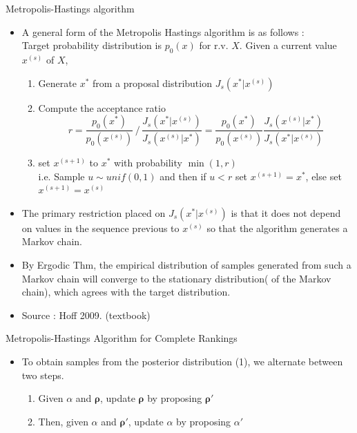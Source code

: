 \documentclass[11pt]{beamer}
\begin{document}
\begin{frame}{Metropolis-Hastings algorithm}
\begin{itemize}
    \item A general form of the Metropolis Hastings algorithm is as follows : \\ Target probability distribution is $p_0(x)$ for r.v. $X$. Given a current value $x^{(s)}$ of $X$, 
        \begin{enumerate}
            \item Generate $x^{*}$ from a proposal distribution $J_s(x^{*}|x^{(s)})$
            \item Compute the acceptance ratio $$ r=\frac{p_0(x^*)}{p_0(x^{(s)})}\, /\, \frac{J_s(x^*|x^{(s)})}{J_s(x^{(s)}|x^*)} = \frac{p_0(x^*)}{p_0(x^{(s)})}\frac{J_s(x^{(s)}|x^*)}{J_s(x^*|x^{(s)})} $$
            \item set $x^{(s+1)}$ to $x^*$ with probability $\min (1, r)$ \\ i.e. Sample $u\sim unif(0,1)$ and then if $u<r$ set $x^{(s+1)}=x^*$, else set $x^{(s+1)}=x^{(s)}$
        \end{enumerate}
    \item The primary restriction placed on $J_s(x^*|x^{(s)})$ is that it does not depend on values in the sequence previous to $x^{(s)}$ so that the algorithm generates a Markov chain.
    \item By Ergodic Thm, the empirical distribution of samples generated from such a Markov chain will converge to the stationary distribution( of the Markov chain), which agrees with the target distribution.
    \item Source : Hoff 2009. (textbook)
\end{itemize}
\end{frame}

\begin{frame}{Metropolis-Hastings Algorithm for Complete Rankings}
\begin{itemize}
    \item To obtain samples from the posterior distribution (1), we alternate between two steps.
    \begin{enumerate}
        \item Given $\alpha$ and $\boldsymbol{\rho}$, update $\boldsymbol{\rho}$ by proposing $\boldsymbol{\rho}'$
        \item Then, given $\alpha$ and $\boldsymbol{\rho}'$, update $\alpha$ by proposing $\alpha'$
    \end{enumerate}
\end{itemize}
\end{frame}
\end{document}
